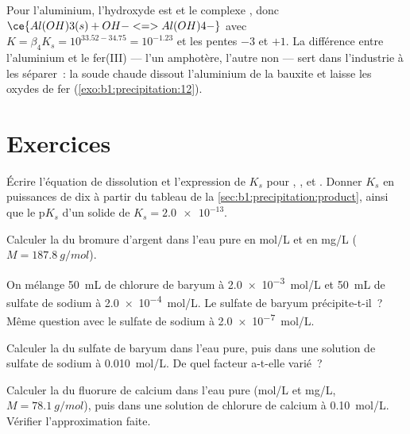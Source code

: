Pour l'aluminium, l'hydroxyde est  et le complexe
, donc $\ce{Al(OH)3(s) + OH- <=> Al(OH)4-}$ avec $K = \beta_4 K_s = 10^{33.52
- 34.75} = 10^{-1.23}$ et les pentes $-3$ et $+1$. La différence entre
l'aluminium et le fer(III) --- l'un amphotère, l'autre non --- sert dans
l'industrie à les séparer~: la soude chaude dissout l'aluminium de la
bauxite et laisse les oxydes de fer (\cref{exo:b1:precipitation:12}).

\section{Exercices}

\begin{exercise}[$\star$]\label{exo:b1:precipitation:1}
Écrire l'équation de dissolution et l'expression de $K_s$ pour
, ,  et . Donner $K_s$ en
puissances de dix à partir du tableau de la
\cref{sec:b1:precipitation:product}, ainsi que le $\mathrm{p}K_s$ d'un
solide de $K_s = \num{2.0e-13}$.
\end{exercise}

\begin{exercise}[$\star$]\label{exo:b1:precipitation:2}
Calculer la  du bromure d'argent dans l'eau pure en
\unit{mol/L} et en \unit{mg/L} ($M = \qty{187.8}{g/mol}$).
\end{exercise}

\begin{exercise}[$\star$]\label{exo:b1:precipitation:3}
On mélange \qty{50}{mL} de chlorure de baryum à \qty{2.0e-3}{mol/L} et
\qty{50}{mL} de sulfate de sodium à \qty{2.0e-4}{mol/L}. Le sulfate de
baryum précipite-t-il~? Même question avec le sulfate de sodium à
\qty{2.0e-7}{mol/L}.
\end{exercise}

\begin{exercise}[$\star$]\label{exo:b1:precipitation:4}
Calculer la  du sulfate de baryum dans l'eau pure, puis dans
une solution de sulfate de sodium à \qty{0.010}{mol/L}. De quel facteur
a-t-elle varié~?
\end{exercise}

\begin{exercise}[$\star\star$]\label{exo:b1:precipitation:5}
Calculer la  du fluorure de calcium dans l'eau pure
(\unit{mol/L} et \unit{mg/L}, $M = \qty{78.1}{g/mol}$), puis dans une
solution de chlorure de calcium à \qty{0.10}{mol/L}. Vérifier
l'approximation faite.
\end{exercise}

